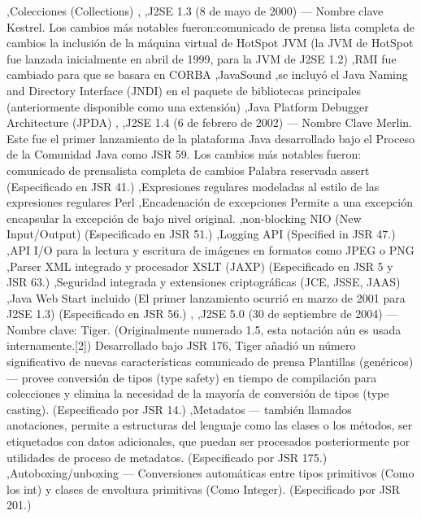 \documentclass[11pt,a4paper]{book}
\begin{document}
							,Colecciones (Collections)
	\bigskip
							,
	\bigskip
							,J2SE 1.3 (8 de mayo de 2000) — Nombre clave Kestrel. Los cambios más notables fueron:comunicado de prensa lista completa de cambios la inclusión de la máquina virtual de HotSpot JVM (la JVM de HotSpot fue lanzada inicialmente en abril de 1999, para la JVM de J2SE 1.2)
	\bigskip
							,RMI fue cambiado para que se basara en CORBA
	\bigskip
							,JavaSound
	\bigskip
							,se incluyó el Java Naming and Directory Interface (JNDI) en el paquete de bibliotecas principales (anteriormente disponible como una extensión)
	\bigskip
							,Java Platform Debugger Architecture (JPDA)
	\bigskip
							,
	\bigskip
							,J2SE 1.4 (6 de febrero de 2002) — Nombre Clave Merlin. Este fue el primer lanzamiento de la plataforma Java desarrollado bajo el Proceso de la Comunidad Java como JSR 59. Los cambios más notables fueron: comunicado de prensalista completa de cambios Palabra reservada assert (Especificado en JSR 41.)
	\bigskip
							,Expresiones regulares modeladas al estilo de las expresiones regulares Perl
	\bigskip
							,Encadenación de excepciones Permite a una excepción encapsular la excepción de bajo nivel original.
	\bigskip
							,non-blocking NIO (New Input/Output) (Especificado en JSR 51.)
	\bigskip
							,Logging API (Specified in JSR 47.)
	\bigskip
							,API I/O para la lectura y escritura de imágenes en formatos como JPEG o PNG
	\bigskip
							,Parser XML integrado y procesador XSLT (JAXP) (Especificado en JSR 5 y JSR 63.)
	\bigskip
							,Seguridad integrada y extensiones criptográficas (JCE, JSSE, JAAS)
	\bigskip
							,Java Web Start incluido (El primer lanzamiento ocurrió en marzo de 2001 para J2SE 1.3) (Especificado en JSR 56.)
	\bigskip
							,
	\bigskip
							,J2SE 5.0 (30 de septiembre de 2004) — Nombre clave: Tiger. (Originalmente numerado 1.5, esta notación aún es usada internamente.[2]) Desarrollado bajo JSR 176, Tiger añadió un número significativo de nuevas características comunicado de prensa Plantillas (genéricos) — provee conversión de tipos (type safety) en tiempo de compilación para colecciones y elimina la necesidad de la mayoría de conversión de tipos (type casting). (Especificado por JSR 14.)
	\bigskip
							,Metadatos — también llamados anotaciones, permite a estructuras del lenguaje como las clases o los métodos, ser etiquetados con datos adicionales, que puedan ser procesados posteriormente por utilidades de proceso de metadatos. (Especificado por JSR 175.)
	\bigskip
							,Autoboxing/unboxing — Conversiones automáticas entre tipos primitivos (Como los int) y clases de envoltura primitivas (Como Integer). (Especificado por JSR 201.)
\end{document}

